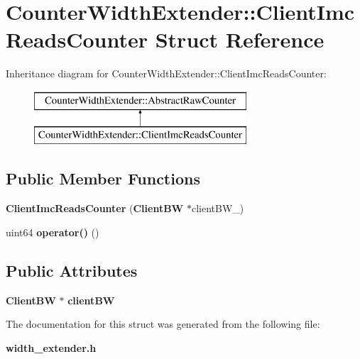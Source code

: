 \section{Counter\+Width\+Extender\+:\+:Client\+Imc\+Reads\+Counter Struct Reference}
\label{structCounterWidthExtender_1_1ClientImcReadsCounter}
Inheritance diagram for Counter\+Width\+Extender\+:\+:Client\+Imc\+Reads\+Counter\+:\begin{figure}[H]
\begin{center}
\leavevmode
\includegraphics[height=2.000000cm]{structCounterWidthExtender_1_1ClientImcReadsCounter}
\end{center}
\end{figure}
\subsection*{Public Member Functions}
\begin{DoxyCompactItemize}
\item 
{\bfseries Client\+Imc\+Reads\+Counter} ({\bf Client\+B\+W} $\ast$client\+B\+W\+\_\+)\label{structCounterWidthExtender_1_1ClientImcReadsCounter_af716a073cdd4e2d027eb9f74ae6582a6}

\item 
uint64 {\bfseries operator()} ()\label{structCounterWidthExtender_1_1ClientImcReadsCounter_a2ce041afc601d13a4c19d75c2fae548f}

\end{DoxyCompactItemize}
\subsection*{Public Attributes}
\begin{DoxyCompactItemize}
\item 
{\bf Client\+B\+W} $\ast$ {\bfseries client\+B\+W}\label{structCounterWidthExtender_1_1ClientImcReadsCounter_a732e6a72ed34d60a3b55c949e7ed015e}

\end{DoxyCompactItemize}


The documentation for this struct was generated from the following file\+:\begin{DoxyCompactItemize}
\item 
{\bf width\+\_\+extender.\+h}\end{DoxyCompactItemize}
